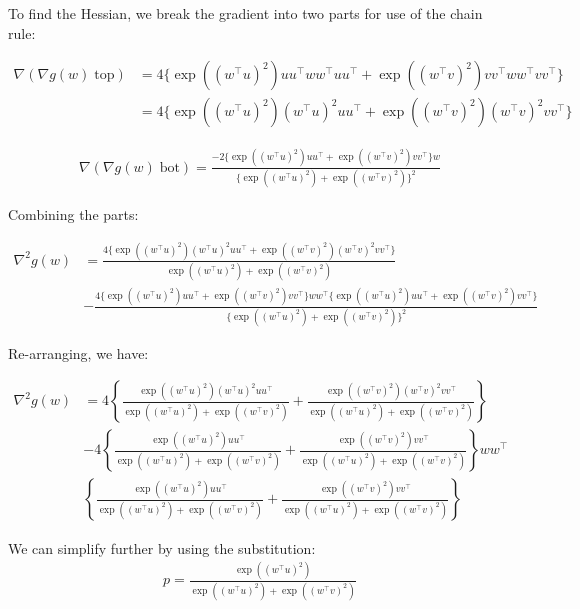 \documentclass[11pt]{article}
\begin{document}
To find the Hessian, we break the gradient into two parts for use of the chain rule:

\begin{align*}
    \nabla (\nabla g(w) \; \textrm{top}) 
    &= 4 \{ \exp((w^{\top}u)^2)uu^{\top}ww^{\top}uu^{\top} + \exp((w^{\top}v)^2)vv^{\top}ww^{\top}vv^{\top} \} \\
    &= 4 \{ \exp((w^{\top}u)^2)(w^{\top}u)^2 uu^{\top} + \exp((w^{\top}v)^2)(w^{\top}v)^2 vv^{\top} \}
\end{align*}

\begin{align*}
    \nabla (\nabla g(w) \; \textrm{bot}) = \frac{ -2 \{ \exp((w^{\top}u)^2)uu^{\top} + \exp((w^{\top}v)^2)vv^{\top} \} w }{ \{ \exp((w^{\top}u)^2) + \exp((w^{\top}v)^2) \}^2 }
\end{align*}

Combining the parts:

\begin{align*}
    \nabla^2 g(w) &= 
    \frac{ 4 \{ \exp((w^{\top}u)^2)(w^{\top}u)^2 uu^{\top} + \exp((w^{\top}v)^2)(w^{\top}v)^2 vv^{\top} \} }{ \exp((w^{\top}u)^2) + \exp((w^{\top}v)^2)  } \\
    &- \frac{ 4 \{ \exp((w^{\top}u)^2)uu^{\top} + \exp((w^{\top}v)^2)vv^{\top}  \} ww^{\top} \{ \exp((w^{\top}u)^2)uu^{\top} + \exp((w^{\top}v)^2)vv^{\top}  \} }{ \{ \exp((w^{\top}u)^2) + \exp((w^{\top}v)^2) \}^2 }
\end{align*}

Re-arranging, we have:

\begin{align*}
    \nabla^2 g(w) &= 
    4 \left\{ \frac{  \exp((w^{\top}u)^2)(w^{\top}u)^2 uu^{\top}  }{ \exp((w^{\top}u)^2) + \exp((w^{\top}v)^2)  } +
    \frac{  \exp((w^{\top}v)^2)(w^{\top}v)^2 vv^{\top}  }{ \exp((w^{\top}u)^2) + \exp((w^{\top}v)^2)  } \right\} \\
    &- 4 \left\{
    \frac{  \exp((w^{\top}u)^2) uu^{\top}  }{ \exp((w^{\top}u)^2) + \exp((w^{\top}v)^2)  } + \frac{  \exp((w^{\top}v)^2) vv^{\top}  }{ \exp((w^{\top}u)^2) + \exp((w^{\top}v)^2)  } \right\}
    ww^{\top} \\
     & \left\{ \frac{  \exp((w^{\top}u)^2) uu^{\top}  }{ \exp((w^{\top}u)^2) + \exp((w^{\top}v)^2)  } + \frac{  \exp((w^{\top}v)^2) vv^{\top}  }{ \exp((w^{\top}u)^2) + \exp((w^{\top}v)^2)  }
     \right\}
\end{align*}

We can simplify further by using the substitution: 
\begin{align*}
p = \frac{\exp((w^{\top}u)^2)}{ \exp((w^{\top}u)^2) + \exp((w^{\top}v)^2) }
\end{align*}
\end{document}
